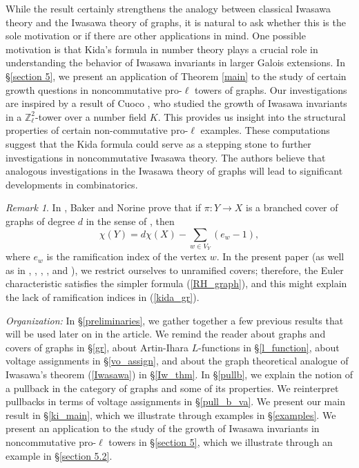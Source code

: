 \documentclass[11pt]{amsart}
\numberwithin{equation}{section}
\theoremstyle{remark}
\newtheorem{remark}[theorem]{Remark}
\newcommand{\Z}{\mathbb{Z}}
\begin{document}
\par While the result certainly strengthens the analogy between classical Iwasawa theory and the Iwasawa theory of graphs, it is natural to ask whether this is the sole motivation or if there are other applications in mind. One possible motivation is that Kida’s formula in number theory plays a crucial role in understanding the behavior of Iwasawa invariants in larger Galois extensions. In \S \ref{section 5}, we present an application of Theorem \ref{main} to the study of certain growth questions in noncommutative pro-$\ell$ towers of graphs. Our investigations are inspired by a result of Cuoco \cite{cuoco1980growth}, who studied the growth of Iwasawa invariants in a $\Z_\ell^2$-tower over a number field $K$. This provides us insight into the structural properties of certain non-commutative pro-$\ell$ examples. These computations suggest that the Kida formula could serve as a stepping stone to further investigations in noncommutative Iwasawa theory. The authors believe that analogous investigations in the Iwasawa theory of graphs will lead to significant developments in combinatorics.
\begin{remark}
In \cite{Baker/Norine:2009}, Baker and Norine prove that if $\pi:Y\rightarrow X$ is a branched cover of graphs of degree $d$ in the sense of \cite[Notes 5.6]{Sunada:2013}, then
\begin{equation} \label{RH_graph_ram}
\chi(Y) = d\chi(X)  - \sum_{w \in V_{Y}}(e_{w} - 1),
\end{equation}
where $e_{w}$ is the ramification index of the vertex $w$.  In the present paper (as well as in \cite{Vallieres:2021, mcgownvallieresII, mcgownvallieresIII}, \cite{lei2022non}, \cite{Sage/Vallieres:2022}, \cite{DLRV}, and \cite{Gonet:2021a, Gonet:2022}), we restrict ourselves to unramified covers; therefore, the Euler characteristic satisfies the simpler formula (\ref{RH_graph}), and this might explain the lack of ramification indices in (\ref{kida_gr}).
\end{remark}
\emph{Organization:} In \S \ref{preliminaries}, we gather together a few previous results that will be used later on in the article.  We remind the reader about graphs and covers of graphs in \S \ref{gr}, about Artin-Ihara $L$-functions in \S \ref{l_function}, about voltage assignments in \S \ref{vo_assign}, and about the graph theoretical analogue of Iwasawa's theorem (\ref{Iwasawa}) in \S \ref{Iw_thm}.  In \S \ref{pullb}, we explain the notion of a pullback in the category of graphs and some of its properties.  We reinterpret pullbacks in terms of voltage assignments in \S \ref{pull_b_va}.  We present our main result in \S \ref{ki_main}, which we illustrate through examples in \S \ref{examples}. We present an application to the study of the growth of Iwasawa invariants in noncommutative pro-$\ell$ towers in \S \ref{section 5}, which we illustrate through an example in \S \ref{section 5.2}. 
\end{document}
